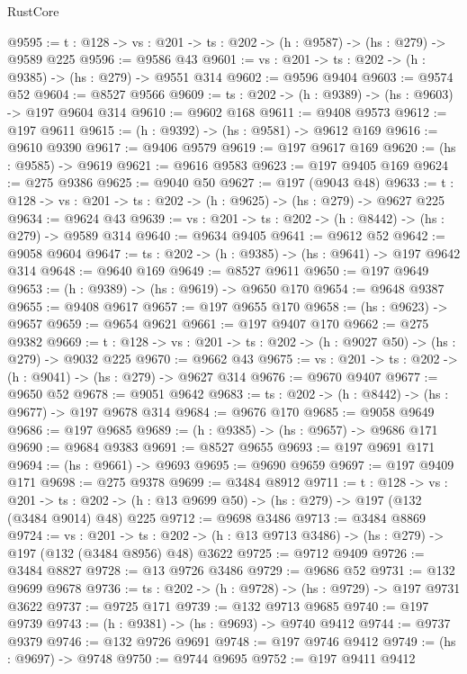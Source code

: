 \begin{lexlean}{RustCore}
\begin{coremodule}
@9595 := {t : @128} -> {vs : @201} -> {ts : @202} -> (h : @9587) -> (hs : @279) -> @9589 @225
@9596 := @9586 @43
@9601 := {vs : @201} -> {ts : @202} -> (h : @9385) -> (hs : @279) -> @9551 @314
@9602 := @9596 @9404
@9603 := @9574 @52
@9604 := @8527 @9566
@9609 := {ts : @202} -> (h : @9389) -> (hs : @9603) -> @197 @9604 @314
@9610 := @9602 @168
@9611 := @9408 @9573
@9612 := @197 @9611
@9615 := (h : @9392) -> (hs : @9581) -> @9612 @169
@9616 := @9610 @9390
@9617 := @9406 @9579
@9619 := @197 @9617 @169
@9620 := (hs : @9585) -> @9619
@9621 := @9616 @9583
@9623 := @197 @9405 @169
@9624 := @275 @9386
@9625 := @9040 @50
@9627 := @197 (@9043 @48)
@9633 := {t : @128} -> {vs : @201} -> {ts : @202} -> (h : @9625) -> (hs : @279) -> @9627 @225
@9634 := @9624 @43
@9639 := {vs : @201} -> {ts : @202} -> (h : @8442) -> (hs : @279) -> @9589 @314
@9640 := @9634 @9405
@9641 := @9612 @52
@9642 := @9058 @9604
@9647 := {ts : @202} -> (h : @9385) -> (hs : @9641) -> @197 @9642 @314
@9648 := @9640 @169
@9649 := @8527 @9611
@9650 := @197 @9649
@9653 := (h : @9389) -> (hs : @9619) -> @9650 @170
@9654 := @9648 @9387
@9655 := @9408 @9617
@9657 := @197 @9655 @170
@9658 := (hs : @9623) -> @9657
@9659 := @9654 @9621
@9661 := @197 @9407 @170
@9662 := @275 @9382
@9669 := {t : @128} -> {vs : @201} -> {ts : @202} -> (h : @9027 @50) -> (hs : @279) -> @9032 @225
@9670 := @9662 @43
@9675 := {vs : @201} -> {ts : @202} -> (h : @9041) -> (hs : @279) -> @9627 @314
@9676 := @9670 @9407
@9677 := @9650 @52
@9678 := @9051 @9642
@9683 := {ts : @202} -> (h : @8442) -> (hs : @9677) -> @197 @9678 @314
@9684 := @9676 @170
@9685 := @9058 @9649
@9686 := @197 @9685
@9689 := (h : @9385) -> (hs : @9657) -> @9686 @171
@9690 := @9684 @9383
@9691 := @8527 @9655
@9693 := @197 @9691 @171
@9694 := (hs : @9661) -> @9693
@9695 := @9690 @9659
@9697 := @197 @9409 @171
@9698 := @275 @9378
@9699 := @3484 @8912
@9711 := {t : @128} ->
  {vs : @201} ->
  {ts : @202} -> (h : @13 @9699 @50) -> (hs : @279) -> @197 (@132 (@3484 @9014) @48) @225
@9712 := @9698 @3486
@9713 := @3484 @8869
@9724 := {vs : @201} ->
  {ts : @202} -> (h : @13 @9713 @3486) -> (hs : @279) -> @197 (@132 (@3484 @8956) @48) @3622
@9725 := @9712 @9409
@9726 := @3484 @8827
@9728 := @13 @9726 @3486
@9729 := @9686 @52
@9731 := @132 @9699 @9678
@9736 := {ts : @202} -> (h : @9728) -> (hs : @9729) -> @197 @9731 @3622
@9737 := @9725 @171
@9739 := @132 @9713 @9685
@9740 := @197 @9739
@9743 := (h : @9381) -> (hs : @9693) -> @9740 @9412
@9744 := @9737 @9379
@9746 := @132 @9726 @9691
@9748 := @197 @9746 @9412
@9749 := (hs : @9697) -> @9748
@9750 := @9744 @9695
@9752 := @197 @9411 @9412

\end{coremodule}
\end{lexlean}
